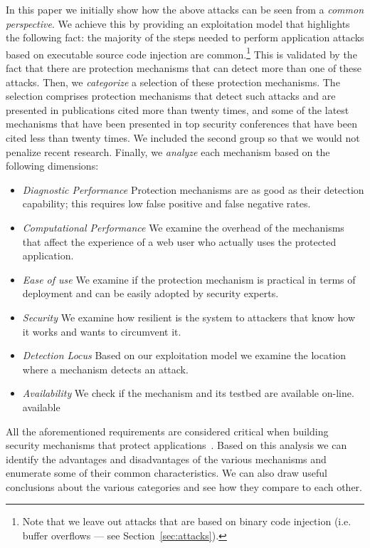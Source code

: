 \documentclass[conference]{IEEEtran}
\begin{document}
In this paper we initially show how the above attacks can be seen from
a {\it common perspective}. We achieve this by providing an
exploitation model that highlights the following fact: the majority of
the steps needed to perform application attacks based on executable
source code injection are common.\footnote{Note that we leave out
  attacks that are based on binary code injection (i.e. buffer
  overflows --- see Section~\ref{sec:attacks}).} This is validated by
the fact that there are protection mechanisms that can detect more
than one of these attacks. Then, we {\it categorize} a selection of
these protection mechanisms. The selection comprises protection
mechanisms that detect such attacks and are presented in publications
cited more than twenty times, and some of the latest mechanisms that
have been presented in top security conferences that have been cited
less than twenty times. We included the second group so that we would
not penalize recent research. Finally, we {\it analyze} each mechanism based
on the following dimensions:
\begin{itemize}
\item {\it Diagnostic Performance} Protection mechanisms are as good
  as their detection capability; this requires low false positive and
  false negative rates.
\item {\it Computational Performance} We examine
  the overhead of the mechanisms
  that affect the experience of a web user who actually
  uses the protected application.
\item {\it Ease of use} We examine if the protection
  mechanism is practical in terms of deployment
  and can be easily adopted by security experts.
\item {\it Security} We examine how resilient is the system to
  attackers that know how it works and wants to circumvent it.
\item {\it Detection Locus} Based on our exploitation model
  we examine the location where a mechanism detects an attack.
\item {\it Availability} We check if the mechanism and its
  testbed are available on-line.
available 
\end{itemize}

\noindent
All the aforementioned requirements are considered critical
when building security mechanisms that protect
applications~\cite{A01,A00,SPWS13}. Based on this analysis
we can identify the advantages and disadvantages of the
various mechanisms and enumerate some of their common
characteristics. We can also draw useful conclusions
about the various categories and see how they compare
to each other.
\end{document}

